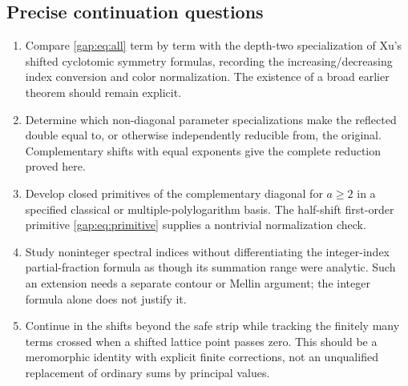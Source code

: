 \subsection{Precise continuation questions}

\begin{enumerate}
\item Compare \eqref{gap:eq:all} term by term with the depth-two
specialization of Xu's shifted cyclotomic symmetry formulas, recording
the increasing/decreasing index conversion and color normalization.
The existence of a broad earlier theorem should remain explicit.
\item Determine which non-diagonal parameter specializations make the
reflected double equal to, or otherwise independently reducible from,
the original. Complementary shifts with equal exponents give the
complete reduction proved here.
\item Develop closed primitives of the complementary diagonal for
$a\geq2$ in a specified classical or multiple-polylogarithm basis.
The half-shift first-order primitive \eqref{gap:eq:primitive} supplies
a nontrivial normalization check.
\item Study noninteger spectral indices without differentiating the
integer-index partial-fraction formula as though its summation range
were analytic. Such an extension needs a separate contour or Mellin
argument; the integer formula alone does not justify it.
\item Continue in the shifts beyond the safe strip while tracking the
finitely many terms crossed when a shifted lattice point passes zero.
This should be a meromorphic identity with explicit finite
corrections, not an unqualified replacement of ordinary sums by
principal values.
\end{enumerate}
